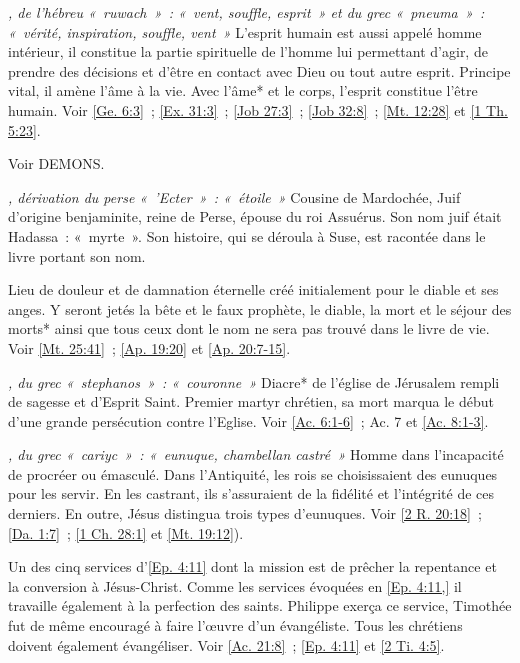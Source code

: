\begin{multicols}{2}
\textit{, de l'hébreu «~ruwach~»~: «~vent, souffle, esprit~» et du grec «~pneuma~»~: «~vérité, inspiration, souffle, vent~»}\newline
L'esprit humain est aussi appelé homme intérieur, il constitue la partie spirituelle de l'homme lui permettant d'agir, de prendre des décisions et d'être en contact avec Dieu ou tout autre esprit. Principe vital, il amène l'âme à la vie. Avec l'âme* et le corps, l'esprit constitue l'être humain. Voir \vref{Ge. 6:3}~; \vref{Ex. 31:3}~; \vref{Job 27:3}~; \vref{Job 32:8}~; \vref{Mt. 12:28} et \vref{1 Th. 5:23}.

\textit{}\newline
Voir DEMONS.

\textit{, dérivation du perse «~'Ecter~»~: «~étoile~»}\newline
Cousine de Mardochée, Juif d'origine benjaminite, reine de Perse, épouse du roi Assuérus. Son nom juif était Hadassa~: «~myrte~». Son histoire, qui se déroula à Suse, est racontée dans le livre portant son nom.

\textit{}\newline
Lieu de douleur et de damnation éternelle créé initialement pour le diable et ses anges. Y seront jetés la bête et le faux prophète, le diable, la mort et le séjour des morts* ainsi que tous ceux dont le nom ne sera pas trouvé dans le livre de vie. Voir \vref{Mt. 25:41}~; \vref{Ap. 19:20} et \vref{Ap. 20:7-15}.

\textit{, du grec «~stephanos~»~: «~couronne~»}\newline
Diacre* de l'église de Jérusalem rempli de sagesse et d'Esprit Saint. Premier martyr chrétien, sa mort marqua le début d'une grande persécution contre l'Eglise. Voir \vref{Ac. 6:1-6}~; Ac. 7 et \vref{Ac. 8:1-3}.

\textit{, du grec «~cariyc~»~: «~eunuque, chambellan castré~»}\newline
Homme dans l'incapacité de procréer ou émasculé. Dans l'Antiquité, les rois se choisissaient des eunuques pour les servir. En les castrant, ils s'assuraient de la fidélité et l'intégrité de ces derniers. En outre, Jésus distingua trois types d'eunuques. Voir \vref{2 R. 20:18}~; \vref{Da. 1:7}~; \vref{1 Ch. 28:1} et \vref{Mt. 19:12}).

\textit{}\newline
Un des cinq services d'\vref{Ep. 4:11} dont la mission est de prêcher la repentance et la conversion à Jésus-Christ. Comme les services évoquées en \vref{Ep. 4:11,} il travaille également à la perfection des saints. Philippe exerça ce service, Timothée fut de même encouragé à faire l'œuvre d'un évangéliste. Tous les chrétiens doivent également évangéliser. Voir \vref{Ac. 21:8}~; \vref{Ep. 4:11} et \vref{2 Ti. 4:5}.


\end{multicols}
